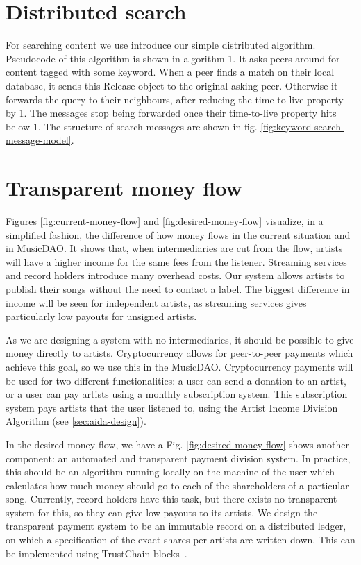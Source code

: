 \section{Distributed search}
For searching content we use introduce our simple distributed algorithm. Pseudocode of this algorithm is shown in algorithm 1. It asks peers around for content tagged with some keyword. When a peer finds a match on their local database, it sends this Release object to the original asking peer. Otherwise it forwards the query to their neighbours, after reducing the time-to-live property by 1. The messages stop being forwarded once their time-to-live property hits below 1. The structure of search messages are shown in fig. \ref{fig:keyword-search-message-model}.

\section{Transparent money flow}
Figures \ref{fig:current-money-flow} and \ref{fig:desired-money-flow} visualize, in a simplified fashion, the difference of how money flows in the current situation and in MusicDAO. It shows that, when intermediaries are cut from the flow, artists will have a higher income for the same fees from the listener. Streaming services and record holders introduce many overhead costs. Our system allows artists to publish their songs without the need to contact a label. The biggest difference in income will be seen for independent artists, as streaming services gives particularly low payouts for unsigned artists.

As we are designing a system with no intermediaries, it should be possible to give money directly to artists. Cryptocurrency allows for peer-to-peer payments which achieve this goal, so we use this in the MusicDAO. Cryptocurrency payments will be used for two different functionalities: a user can send a donation to an artist, or a user can pay artists using a monthly subscription system. This subscription system pays artists that the user listened to, using the Artist Income Division Algorithm (see \ref{sec:aida-design}). 

In the desired money flow, we have a  Fig. \ref{fig:desired-money-flow} shows another component: an automated and transparent payment division system. In practice, this should be an algorithm running locally on the machine of the user which calculates how much money should go to each of the shareholders of a particular song. Currently, record holders have this task, but there exists no transparent system for this, so they can give low payouts to its artists. We design the transparent payment system to be an immutable record on a distributed ledger, on which a specification of the exact shares per artists are written down. This can be implemented using TrustChain blocks~\citep{otte2017trustchain}.

